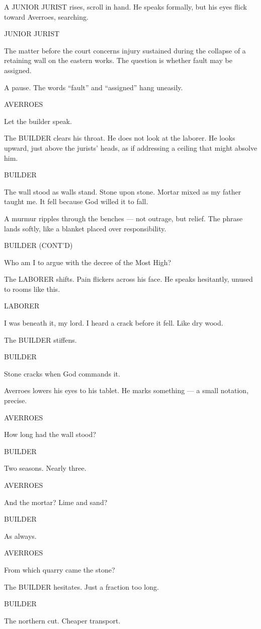 \documentclass[12pt]{article}
\newlength{\charindent}
\newlength{\dialogueindent}
\newlength{\dialoguewidth}
\newcommand{\action}[1]{%
  \noindent#1\par\vspace{0.75em}%
}
\newcommand{\character}[1]{%
  \needspace{3\baselineskip}%
  \par\vspace{0.5em}%
  \noindent\hspace*{\charindent}\MakeUppercase{#1}\nopagebreak[4]%
}
\newcommand{\dialogue}[1]{%
  \par\nobreak\nopagebreak[4]%
  \noindent\hspace*{\dialogueindent}%
  \begin{minipage}[t]{\dialoguewidth}
  #1
  \end{minipage}%
  \par\vspace{0.5em}%
}
\newcommand{\contd}{\textsc{(cont'd)}}
\begin{document}
\action{A JUNIOR JURIST rises, scroll in hand. He speaks formally, but his eyes flick toward Averroes, searching.}

\character{JUNIOR JURIST}
\dialogue{The matter before the court concerns injury sustained during the collapse of a retaining wall on the eastern works. The question is whether fault may be assigned.}

\action{A pause. The words “fault” and “assigned” hang uneasily.}

\character{AVERROES}
\dialogue{Let the builder speak.}

\action{The BUILDER clears his throat. He does not look at the laborer. He looks upward, just above the jurists’ heads, as if addressing a ceiling that might absolve him.}

\character{BUILDER}
\dialogue{The wall stood as walls stand. Stone upon stone. Mortar mixed as my father taught me. It fell because God willed it to fall.}

\action{A murmur ripples through the benches — not outrage, but relief. The phrase lands softly, like a blanket placed over responsibility.}

\character{BUILDER \contd}
\dialogue{Who am I to argue with the decree of the Most High?}

\action{The LABORER shifts. Pain flickers across his face. He speaks hesitantly, unused to rooms like this.}

\character{LABORER}
\dialogue{I was beneath it, my lord. I heard a crack before it fell. Like dry wood.}

\action{The BUILDER stiffens.}

\character{BUILDER}
\dialogue{Stone cracks when God commands it.}

\action{Averroes lowers his eyes to his tablet. He marks something — a small notation, precise.}

\character{AVERROES}
\dialogue{How long had the wall stood?}

\character{BUILDER}
\dialogue{Two seasons. Nearly three.}

\character{AVERROES}
\dialogue{And the mortar? Lime and sand?}

\character{BUILDER}
\dialogue{As always.}

\character{AVERROES}
\dialogue{From which quarry came the stone?}

\action{The BUILDER hesitates. Just a fraction too long.}

\character{BUILDER}
\dialogue{The northern cut. Cheaper transport.}
\end{document}
